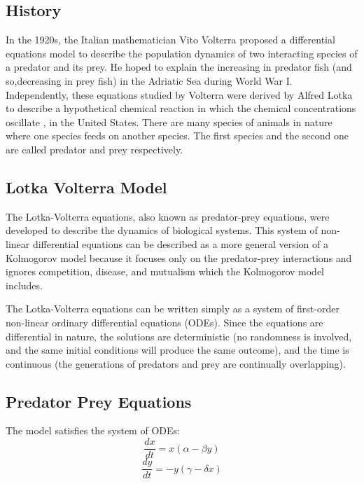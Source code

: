 \documentclass[12pt]{article}
\begin{document}
\subsection*{History\cite{noauthor_lotkavolterra_nodate}}
In the 1920s, the Italian mathematician Vito Volterra proposed a differential equations model to describe the population dynamics of two interacting
species of a predator and its prey. He hoped to explain the increasing in predator fish (and so,decreasing in prey fish) in the Adriatic Sea during World War
I. Independently, these equations studied by Volterra were derived by Alfred Lotka to describe a hypothetical chemical reaction in which the chemical
concentrations oscillate , in the United States. There are many species of
animals in nature where one species feeds on another species. The first species
and the second one are called predator and prey respectively.\\

\subsection*{Lotka Volterra Model}
The Lotka-Volterra equations, also known as predator-prey equations, were developed to describe the dynamics of biological systems. This system of non-linear differential equations can be described as a more general version of a Kolmogorov model\cite{noauthor_kolmogorov_nodate} because it focuses only on the predator-prey interactions and ignores competition, disease, and mutualism which the Kolmogorov model includes. \par The Lotka-Volterra equations can be written simply as a system of first-order non-linear ordinary differential equations (ODEs). Since the equations are differential in nature, the solutions are deterministic (no randomness is involved, and the same initial conditions will produce the same outcome), and the time is continuous (the generations of predators and prey are continually overlapping). 
\newpage

\subsection*{Predator Prey Equations\cite{noauthor_lotkavolterra_nodate}}
The model satisfies the
system of ODEs: \\
\begin{equation*}
\frac { d x } { d t } = x ( \alpha - \beta y )
\end{equation*}
\begin{equation*}
\frac { d y } { d t } = - y ( \gamma - \delta x )
\end{equation*}
\end{document}
